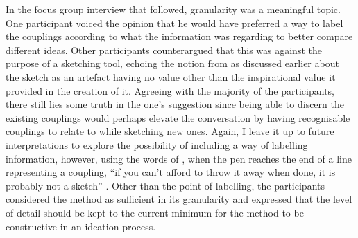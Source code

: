 In the focus group interview that followed, granularity was a meaningful topic. One participant voiced the opinion that he would have preferred a way to label the couplings according to what the information was regarding to better compare different ideas. Other participants counterargued that this was against the purpose of a sketching tool, echoing the notion from  as discussed earlier about the sketch as an artefact having no value other than the inspirational value it provided in the creation of it. Agreeing with the majority of the participants, there still lies some truth in the one's suggestion since being able to discern the existing couplings would perhaps elevate the conversation by having recognisable couplings to relate to while sketching new ones. Again, I leave it up to future interpretations to explore the possibility of including a way of labelling information, however, using the words of , when the pen reaches the end of a line representing a coupling, ``if you can’t afford to throw it away when done, it is probably not a sketch'' \cite[p. 111]{buxton}. Other than the point of labelling, the participants considered the method as sufficient in its granularity and expressed that the level of detail should be kept to the current minimum for the method to be constructive in an ideation process.
